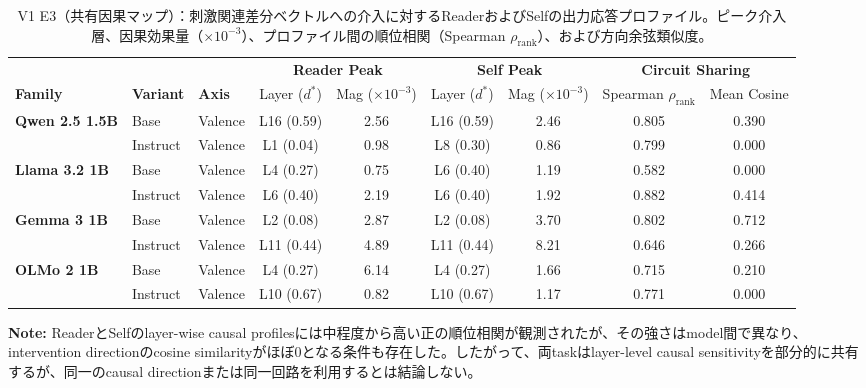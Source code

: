 \begin{table}[htbp]
\centering
\small
\caption{V1 E3（共有因果マップ）：刺激関連差分ベクトルへの介入に対するReaderおよびSelfの出力応答プロファイル。ピーク介入層、因果効果量（$\times 10^{-3}$）、プロファイル間の順位相関（Spearman $\rho_{\text{rank}}$）、および方向余弦類似度。}
\label{tab:v1_causal_profile}
\begin{tabular}{lll cccc cc}
\toprule
 & & & \multicolumn{2}{c}{\textbf{Reader Peak}} & \multicolumn{2}{c}{\textbf{Self Peak}} & \multicolumn{2}{c}{\textbf{Circuit Sharing}} \\
\cmidrule(lr){4-5} \cmidrule(lr){6-7} \cmidrule(lr){8-9}
\textbf{Family} & \textbf{Variant} & \textbf{Axis} & Layer ($d^*$) & Mag ($\times 10^{-3}$) & Layer ($d^*$) & Mag ($\times 10^{-3}$) & Spearman $\rho_{\text{rank}}$ & Mean Cosine \\
\midrule
\multirow{2}{*}{\textbf{Qwen 2.5 1.5B}} & Base       & Valence & L16 (0.59)   & 2.56       & L16 (0.59)   & 2.46       & 0.805      & 0.390      \\
\cmidrule(lr){2-9}
                                 & Instruct   & Valence & L1 (0.04)    & 0.98       & L8 (0.30)    & 0.86       & 0.799      & 0.000      \\
\midrule
\multirow{2}{*}{\textbf{Llama 3.2 1B}} & Base       & Valence & L4 (0.27)    & 0.75       & L6 (0.40)    & 1.19       & 0.582      & 0.000      \\
\cmidrule(lr){2-9}
                                 & Instruct   & Valence & L6 (0.40)    & 2.19       & L6 (0.40)    & 1.92       & 0.882      & 0.414      \\
\midrule
\multirow{2}{*}{\textbf{Gemma 3 1B}} & Base       & Valence & L2 (0.08)    & 2.87       & L2 (0.08)    & 3.70       & 0.802      & 0.712      \\
\cmidrule(lr){2-9}
                                 & Instruct   & Valence & L11 (0.44)   & 4.89       & L11 (0.44)   & 8.21       & 0.646      & 0.266      \\
\midrule
\multirow{2}{*}{\textbf{OLMo 2 1B}} & Base       & Valence & L4 (0.27)    & 6.14       & L4 (0.27)    & 1.66       & 0.715      & 0.210      \\
\cmidrule(lr){2-9}
                                 & Instruct   & Valence & L10 (0.67)   & 0.82       & L10 (0.67)   & 1.17       & 0.771      & 0.000      \\
\bottomrule
\end{tabular}
\vspace{1ex}
\begin{minipage}{\linewidth}
\footnotesize
\textbf{Note:} ReaderとSelfのlayer-wise causal profilesには中程度から高い正の順位相関が観測されたが、その強さはmodel間で異なり、intervention directionのcosine similarityがほぼ0となる条件も存在した。したがって、両taskはlayer-level causal sensitivityを部分的に共有するが、同一のcausal directionまたは同一回路を利用するとは結論しない。
\end{minipage}
\end{table}